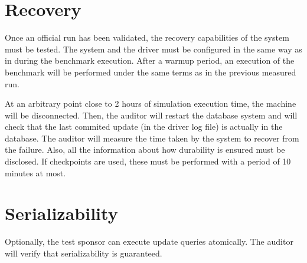 \section{Recovery}

Once an official run has been validated, the recovery capabilities of the
system must be tested. The system and the driver must be configured in the
same way as in during the benchmark execution. After a warmup period, an
execution of the benchmark will be performed under the same terms as in the
previous measured run.

At an arbitrary point close to 2 hours of simulation execution time, the machine
will be disconnected.  Then, the auditor will restart the database system and
will check that the last commited update (in the driver log file) is actually
in the database. The auditor will measure the time taken by the system to
recover from the failure. Also, all the information about how durability is
ensured must be disclosed. If checkpoints are used, these must be performed
with a period of 10 minutes at most.


\section{Serializability}

Optionally, the test sponsor can execute update queries atomically. The auditor
will verify that serializability is guaranteed.
